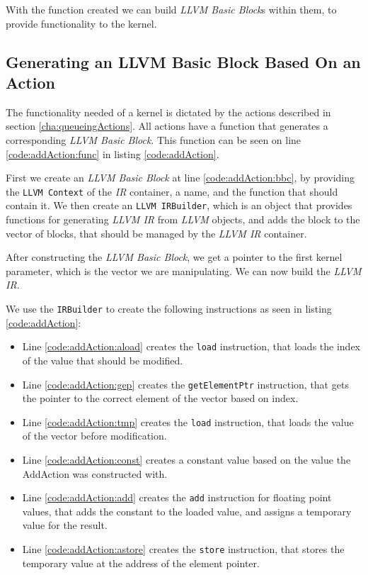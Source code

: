 With the function created we can build \textit{LLVM Basic Block}s within them, to provide functionality to the kernel.

\subsection{Generating an LLVM Basic Block Based On an Action} \label{sec:bbbuilding}
The functionality needed of a kernel is dictated by the actions described in section \ref{cha:queueingActions}. All actions have a function that generates a corresponding \textit{LLVM Basic Block}. This function can be seen on line \ref{code:addAction:func} in listing \ref{code:addAction}.

First we create an \textit{LLVM Basic Block} at line \ref{code:addAction:bbc}, by providing the \texttt{LLVM Context} of the \textit{IR} container, a name, and the function that should contain it. We then create an \texttt{LLVM IRBuilder}, which is an object that provides functions for generating \textit{LLVM IR} from \textit{LLVM} objects, and adds the block to the vector of blocks, that should be managed by the \textit{LLVM IR} container.

After constructing the \textit{LLVM Basic Block}, we get a pointer to the first kernel parameter, which is the vector we are manipulating. We can now build the \textit{LLVM IR}.

We use the \texttt{IRBuilder} to create the following instructions as seen in listing \ref{code:addAction}:
\begin{itemize}
\item Line \ref{code:addAction:aload} creates the \texttt{load} instruction, that loads the index of the value that should be modified.
\item Line \ref{code:addAction:gep} creates the \texttt{getElementPtr} instruction, that gets the pointer to the correct element of the vector based on index.
\item Line \ref{code:addAction:tmp} creates the \texttt{load} instruction, that loads the value of the vector before modification.
\item Line \ref{code:addAction:const} creates a constant value based on the value the AddAction was constructed with.
\item Line \ref{code:addAction:add} creates the \texttt{add} instruction for floating point values, that adds the constant to the loaded value, and assigns a temporary value for the result.
\item Line \ref{code:addAction:astore} creates the \texttt{store} instruction, that stores the temporary value at the address of the element pointer.
\end{itemize}

